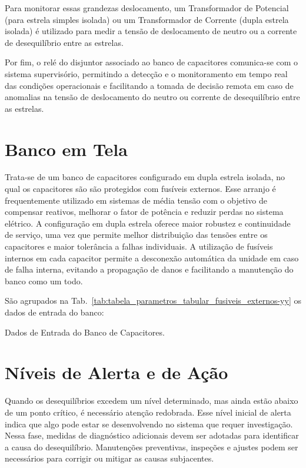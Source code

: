 \documentclass[a4paper]{article}
\begin{document}
Para monitorar essas grandezas deslocamento, um Transformador de Potencial (para estrela simples isolada) ou um Transformador de Corrente (dupla estrela isolada) é utilizado para medir a tensão de deslocamento de neutro ou a corrente de desequilíbrio entre as estrelas.  

Por fim, o relé do disjuntor associado ao banco de capacitores comunica-se com o sistema supervisório, permitindo a detecção e o monitoramento em tempo real das condições operacionais e facilitando a tomada de decisão remota em caso de anomalias na tensão de deslocamento do neutro ou corrente de desequilíbrio entre as estrelas.



\section{Banco em Tela}

Trata-se de um banco de capacitores configurado em dupla estrela isolada, no qual os capacitores são são protegidos com fusíveis externos. Esse arranjo é frequentemente utilizado em sistemas de média tensão com o objetivo de compensar reativos, melhorar o fator de potência e reduzir perdas no sistema elétrico. A configuração em dupla estrela oferece maior robustez e continuidade de serviço, uma vez que permite melhor distribuição das tensões entre os capacitores e maior tolerância a falhas individuais. A utilização de fusíveis internos em cada capacitor permite a desconexão automática da unidade em caso de falha interna, evitando a propagação de danos e facilitando a manutenção do banco como um todo.

São agrupados na Tab.~\ref{tab:tabela_parametros_tabular_fusiveis_externos-yy} os dados de entrada do banco:
\begin{table}[htbp]
	\centering
	\renewcommand{\arraystretch}{1.25}
	\caption[]{Dados de Entrada do Banco de Capacitores.}
	
	\label{tab:tabela_parametros_tabular_fusiveis_externos-yy}
\end{table}






\section{Níveis de Alerta e de Ação}
Quando os desequilíbrios excedem um nível determinado, mas ainda estão abaixo de um ponto crítico, é necessário atenção redobrada. Esse nível inicial de alerta indica que algo pode estar se desenvolvendo no sistema que requer investigação. Nessa fase, medidas de diagnóstico adicionais devem ser adotadas para identificar a causa do desequilíbrio. Manutenções preventivas, inspeções e ajustes podem ser necessários para corrigir ou mitigar as causas subjacentes.
\end{document}

